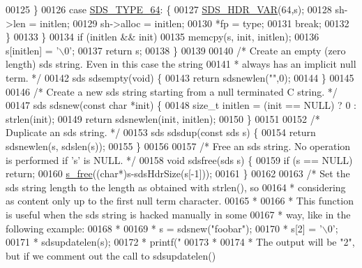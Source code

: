 \begin{DoxyCode}
00125         \}
00126         \textcolor{keywordflow}{case} \hyperlink{sds_8h_ad03c6e0fdab3a871e10cce347e8bb4e6}{SDS\_TYPE\_64}: \{
00127             \hyperlink{sds_8h_a79b76920d1d9bc010926b7af167de89b}{SDS\_HDR\_VAR}(64,s);
00128             sh->len = initlen;
00129             sh->alloc = initlen;
00130             *fp = type;
00131             \textcolor{keywordflow}{break};
00132         \}
00133     \}
00134     \textcolor{keywordflow}{if} (initlen && init)
00135         memcpy(s, init, initlen);
00136     s[initlen] = \textcolor{stringliteral}{'\(\backslash\)0'};
00137     \textcolor{keywordflow}{return} s;
00138 \}
00139 
00140 \textcolor{comment}{/* Create an empty (zero length) sds string. Even in this case the string}
00141 \textcolor{comment}{ * always has an implicit null term. */}
00142 sds sdsempty(\textcolor{keywordtype}{void}) \{
00143     \textcolor{keywordflow}{return} sdsnewlen(\textcolor{stringliteral}{""},0);
00144 \}
00145 
00146 \textcolor{comment}{/* Create a new sds string starting from a null terminated C string. */}
00147 sds sdsnew(\textcolor{keyword}{const} \textcolor{keywordtype}{char} *init) \{
00148     size\_t initlen = (init == NULL) ? 0 : strlen(init);
00149     \textcolor{keywordflow}{return} sdsnewlen(init, initlen);
00150 \}
00151 
00152 \textcolor{comment}{/* Duplicate an sds string. */}
00153 sds sdsdup(\textcolor{keyword}{const} sds s) \{
00154     \textcolor{keywordflow}{return} sdsnewlen(s, sdslen(s));
00155 \}
00156 
00157 \textcolor{comment}{/* Free an sds string. No operation is performed if 's' is NULL. */}
00158 \textcolor{keywordtype}{void} sdsfree(sds s) \{
00159     \textcolor{keywordflow}{if} (s == NULL) \textcolor{keywordflow}{return};
00160     \hyperlink{sdsalloc_8h_aa06cb49194c292098a753d87e2ac6b71}{s\_free}((\textcolor{keywordtype}{char}*)s-sdsHdrSize(s[-1]));
00161 \}
00162 
00163 \textcolor{comment}{/* Set the sds string length to the length as obtained with strlen(), so}
00164 \textcolor{comment}{ * considering as content only up to the first null term character.}
00165 \textcolor{comment}{ *}
00166 \textcolor{comment}{ * This function is useful when the sds string is hacked manually in some}
00167 \textcolor{comment}{ * way, like in the following example:}
00168 \textcolor{comment}{ *}
00169 \textcolor{comment}{ * s = sdsnew("foobar");}
00170 \textcolor{comment}{ * s[2] = '\(\backslash\)0';}
00171 \textcolor{comment}{ * sdsupdatelen(s);}
00172 \textcolor{comment}{ * printf("%
00173 \textcolor{comment}{ *}
00174 \textcolor{comment}{ * The output will be "2", but if we comment out the call to sdsupdatelen()}
}
\end{DoxyCode}
